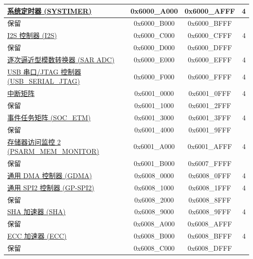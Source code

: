 \begin{ThreePartTable}
\begin{longtable}[c]{ |p{7cm}|c|c|r| }
\hyperref[mod:systimer]{系统定时器 (SYSTIMER)}                    & 0x6000\_A000 & 0x6000\_AFFF &   4        \\\hline
    \rowcolor{gray!25}  保留                    & 0x6000\_B000 & 0x6000\_BFFF &        \\\hline
\hyperref[mod:i2s]{I2S 控制器 (I2S)}            & 0x6000\_C000 & 0x6000\_CFFF &   4     \\\hline
    \rowcolor{gray!25}  保留                    & 0x6000\_D000 & 0x6000\_DFFF &        \\\hline
\hyperref[mod:adc]{逐次逼近型模数转换器 (SAR ADC)}              & 0x6000\_E000 & 0x6000\_EFFF &   4        \\\hline
\hyperref[mod:usbserialjtag]{USB 串口/JTAG 控制器 (USB\_SERIAL\_JTAG)}                  & 0x6000\_F000 & 0x6000\_FFFF &   4     \\\hline                
\hyperref[mod:intmtrx]{中断矩阵}            & 0x6001\_0000 & 0x6001\_0FFF &   4     \\\hline
    \rowcolor{gray!25}  保留                    & 0x6001\_1000 & 0x6001\_2FFF &        \\\hline
\hyperref[mod:evntaskmatrix]{事件任务矩阵 (SOC\_ETM)} & 0x6001\_3000 & 0x6001\_3FFF &   4     \\\hline
    \rowcolor{gray!25}  保留                    & 0x6001\_4000 & 0x6001\_9FFF &        \\\hline
\hyperref[mod:dbgassist]{存储器访问监控 2 (PSARM\_MEM\_MONITOR)} \tnote{\textcolor{red}{2}}                & 0x6001\_A000 & 0x6001\_AFFF &   4   \\\hline    
    \rowcolor{gray!25}  保留                    & 0x6001\_B000 & 0x6007\_FFFF &        \\\hline
\hyperref[mod:dma]{通用 DMA 控制器 (GDMA)}& 0x6008\_0000 & 0x6008\_0FFF &   4     \\\hline
\hyperref[mod:spi]{通用 SPI2 控制器 (GP-SPI2)} & 0x6008\_1000 & 0x6008\_1FFF &   4     \\\hline
    \rowcolor{gray!25}  保留                    & 0x6008\_2000 & 0x6008\_8FFF &         \\\hline
\hyperref[mod:sha]{SHA 加速器 (SHA)} & 0x6008\_9000 & 0x6008\_9FFF &   4     \\\hline
    \rowcolor{gray!25}  保留                    & 0x6008\_A000 & 0x6008\_AFFF &         \\\hline
\hyperref[mod:ecc]{ECC 加速器 (ECC)}& 0x6008\_B000 & 0x6008\_BFFF &   4     \\\hline
    \rowcolor{gray!25}  保留                    & 0x6008\_C000 & 0x6008\_DFFF &         \\\hline

\end{longtable}
\end{ThreePartTable}
